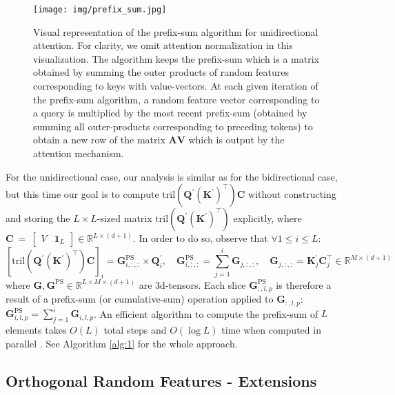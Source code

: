 \begin{figure}[h]
  \centering
  \texttt{[image: img/prefix\_sum.jpg]}
  \caption{\small{Visual representation of the prefix-sum algorithm for unidirectional attention. For clarity, we omit attention normalization in this visualization. The algorithm keeps the prefix-sum which is a matrix obtained by summing the outer products of random features corresponding to keys with value-vectors. At each given iteration of the prefix-sum algorithm, a random feature vector corresponding to a query is multiplied by the most recent prefix-sum (obtained by summing all outer-products corresponding to preceding tokens) to obtain a new row of the matrix $\mathbf{AV}$ which is output by the attention mechanism.\\}}
  \label{fig:prefix_sum}
\end{figure}

For the unidirectional case, our analysis is similar as for the bidirectional case, but this time our goal is to compute $\mathrm{tril}(\mathbf{Q}^{\prime} (\mathbf{K}^{\prime})^\top) \mathbf{C}$ without constructing and storing the $L \times L$-sized matrix $\mathrm{tril}(\mathbf{Q}^{\prime} (\mathbf{K}^{\prime})^\top)$ explicitly, where
$\mathbf{C}~=~\begin{bmatrix} V & \mathbf{1}_L \end{bmatrix} \in \mathbb{R}^{L \times (d + 1)}$. In order to do so, observe that $\forall 1 \leq i \leq L$:
\begin{equation} \label{eq:cumsum}
    [\mathrm{tril}(\mathbf{Q}^{\prime} (\mathbf{K}^{\prime})^\top) \mathbf{C}]_i = \mathbf{G}^\mathrm{PS}_{i,:,:} \times \mathbf{Q}^{\prime}_i, \quad \mathbf{G}^\mathrm{PS}_{i,:,:} = \sum_{j = 1}^i \mathbf{G}_{j,:,:}, \quad \mathbf{G}_{j,:,:} = \mathbf{K}^{\prime}_j \mathbf{C}_j^\top \in \mathbb{R}^{M \times (d + 1)}
\end{equation}
where $\mathbf{G}, \mathbf{G}^\mathrm{PS} \in \mathbb{R}^{L \times M \times (d + 1)}$ are 3d-tensors. Each slice $\mathbf{G}^\mathrm{PS}_{:,l,p}$ is therefore a result of a prefix-sum (or cumulative-sum) operation applied to $\mathbf{G}_{:,l,p}$: $\mathbf{G}^\mathrm{PS}_{i,l,p} = \sum_{j = 1}^i \mathbf{G}_{i,l,p}$. An efficient algorithm to compute the prefix-sum of $L$ elements takes $O(L)$ total steps and $O(\log L)$ time when computed in parallel \citep{cumsum, cormen}. 
See Algorithm \ref{alg:1} for the whole approach.


\subsection{Orthogonal Random Features - Extensions}
\label{subsec:extensions}

